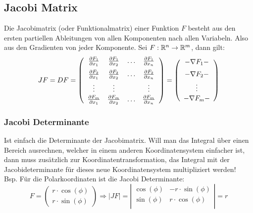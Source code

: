 \subsection{Jacobi Matrix}
Die Jacobimatrix (oder Funktionalmatrix) einer Funktion $F$ besteht aus den ersten partiellen Ableitungen von allen Komponenten nach allen Variabeln. Also aus den Gradienten von jeder Komponente. Sei $F: \mathbb{R}^n \to \mathbb{R}^m$, dann gilt:
\begin{align*}
	JF = DF =
	\left(\begin{array}{cccc}
		\vspace{0.2cm}\frac{\partial F_1}{\partial x_1} & \frac{\partial F_1}{\partial x_2} & \ldots & \frac{\partial F_1}{\partial x_n}\\
		\vspace{0.1cm}\frac{\partial F_2}{\partial x_1} & \frac{\partial F_2}{\partial x_2} & \ldots & \frac{\partial F_2}{\partial x_n}\\
		\vspace{0.05cm}\vdots & \vdots & & \vdots\\
		\frac{\partial F_m}{\partial x_1} & \frac{\partial F_m}{\partial x_2} & \ldots & \frac{\partial F_m}{\partial x_n}
	\end{array}\right)
	=
	\left(\begin{array}{c}
		\vspace{0.2cm} - \nabla F_1 -\\
		\vspace{0.1cm} - \nabla F_2 -\\
		\vspace{0.05cm}\vdots\\
		- \nabla F_m -
	\end{array}\right)
\end{align*}

\subsubsection{Jacobi Determinante}
Ist einfach die Determinante der Jacobimatrix. Will man das Integral über einen Bereich ausrechnen, welcher in einem anderen Koordinatensystem einfacher ist, dann muss zusätzlich zur Koordinatentransformation, das Integral mit der Jacobideterminante für dieses neue Koordinatensystem multipliziert werden!\\
Bsp. Für die Polarkoordinaten ist die Jacobi Determinante:
\[
	F = 
	\left(\begin{array}{c}
		r \cdot \cos(\phi) \\
		r \cdot \sin(\phi)
	\end{array}\right)
	\Rightarrow
	|JF| = 
	\left|\begin{array}{cc}
		\cos(\phi) & -r \cdot \sin(\phi)\\
		\sin(\phi) & r \cdot \cos(\phi)\\
	\end{array}\right|
	= r
\]

